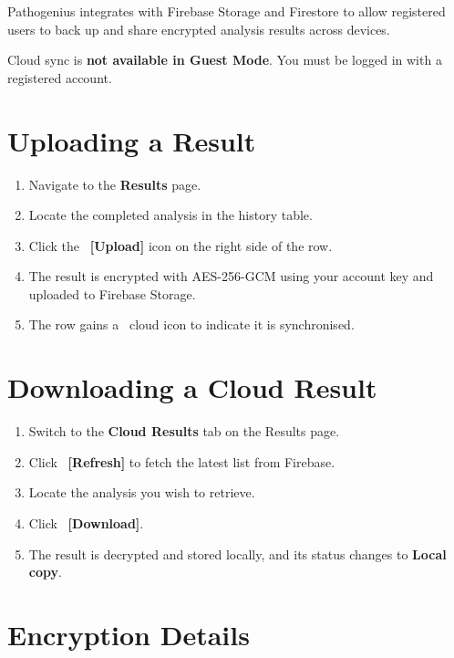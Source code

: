 \documentclass[12pt,a4paper]{report}
\newcommand{\btn}[1]{\textbf{\textcolor{primary}{[#1]}}}
\newcommand{\badge}[2]{\colorbox{#1!20}{\textcolor{#1!70!black}{\small\textbf{#2}}}}
\begin{document}
Pathogenius integrates with Firebase Storage and Firestore to allow registered users to back up and share encrypted analysis results across devices.

\begin{notebox}
  Cloud sync is \textbf{not available in Guest Mode}. You must be logged in with a registered account.
\end{notebox}

\section{Uploading a Result}

\begin{enumerate}[leftmargin=1.5em]
  \item Navigate to the \textbf{Results} page.
  \item Locate the completed analysis in the history table.
  \item Click the \faUpload\ \btn{Upload} icon on the right side of the row.
  \item The result is encrypted with AES-256-GCM using your account key and uploaded to Firebase Storage.
  \item The row gains a \faCloud\ cloud icon to indicate it is synchronised.
\end{enumerate}

\section{Downloading a Cloud Result}

\begin{enumerate}[leftmargin=1.5em]
  \item Switch to the \textbf{Cloud Results} tab on the Results page.
  \item Click \faSync\ \btn{Refresh} to fetch the latest list from Firebase.
  \item Locate the analysis you wish to retrieve.
  \item Click \faDownload\ \btn{Download}.
  \item The result is decrypted and stored locally, and its status changes to \badge{success}{Local copy}.
\end{enumerate}

\section{Encryption Details}
\end{document}
